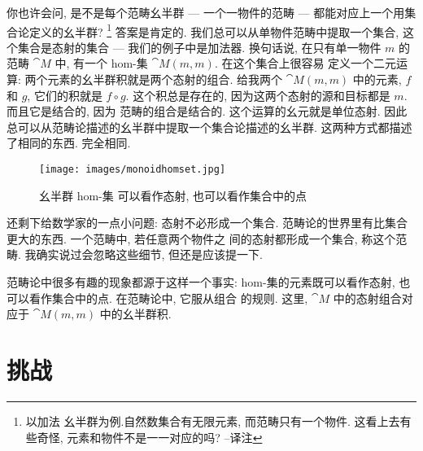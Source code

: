你也许会问, 是不是每个范畴幺半群 --- 一个一物件的范畴 --- 都能对应上一个用集合论定义的幺半群? \footnote{以加法
幺半群为例.自然数集合有无限元素, 而范畴只有一个物件. 这看上去有些奇怪, 元素和物件不是一一对应的吗? --译注}
答案是肯定的. 我们总可以从单物件范畴中提取一个集合, 这个集合是态射的集合 --- 我们的例子中是加法器.
换句话说, 在只有单一物件 $m$ 的范畴 $\cat{M}$ 中, 有一个 hom-集 $\cat{M}(m, m)$. 在这个集合上很容易
定义一个二元运算: 两个元素的幺半群积就是两个态射的组合. 给我两个 $\cat{M}(m, m)$ 中的元素, $f$ 和 $g$,
它们的积就是 $f \circ g$. 这个积总是存在的, 因为这两个态射的源和目标都是 $m$. 而且它是结合的, 因为
范畴的组合是结合的. 这个运算的幺元就是单位态射. 因此总可以从范畴论描述的幺半群中提取一个集合论描述的幺半群.
这两种方式都描述了相同的东西. 完全相同.

\begin{figure}[H]
  \centering
  \texttt{[image: images/monoidhomset.jpg]}
  \caption{幺半群 hom-集 可以看作态射, 也可以看作集合中的点}
\end{figure}

\noindent
还剩下给数学家的一点小问题: 态射不必形成一个集合. 范畴论的世界里有比集合更大的东西. 一个范畴中, 若任意两个物件之
间的态射都形成一个集合, 称这个范畴. 我确实说过会忽略这些细节, 但还是应该提一下.

范畴论中很多有趣的现象都源于这样一个事实: hom-集的元素既可以看作态射, 也可以看作集合中的点. 在范畴论中, 它服从组合
的规则. 这里, $\cat{M}$ 中的态射组合对应于 $\cat{M}(m, m)$ 中的幺半群积.

\section{挑战}

